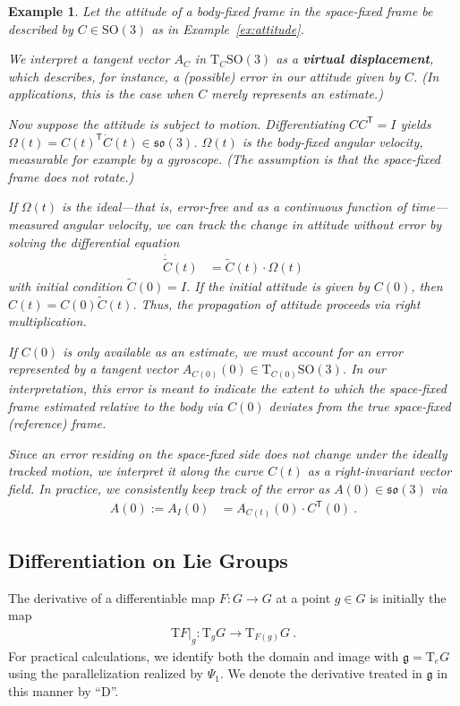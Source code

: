 \documentclass[10pt,a4paper]{article}
\theoremstyle{mytheorem}
\theoremstyle{mydefinition}
\newtheorem{example}[theorem]{Example}
\newcommand{\mydef}[1]{\textbf{\textit{#1}}}
\newcommand{\trans}{^\mathsf{T}}
\newcommand{\Dt}{\mathrm{D}}
\newcommand{\Tt}{\mathrm{T}}
\newcommand{\SO}{\mathrm{SO}}
\newcommand{\fso}{\mathfrak{so}}
\begin{document}
\begin{example}
\label{ex:attitude_error}
Let the attitude of a body-fixed frame in the space-fixed frame be described by $C\in\SO(3)$ as in Example~\ref{ex:attitude}.

We interpret a tangent vector $A_C$ in $\Tt_C\SO(3)$ as a \mydef{virtual displacement}, which describes, for instance, a (possible) error in our attitude given by $C$.
(In applications, this is the case when $C$ merely represents an \emph{estimate}.)

Now suppose the attitude is subject to motion.
Differentiating $CC\trans=I$ yields $\Omega(t)=C(t)\trans\dot{C}(t)\in\fso(3)$.
$\Omega(t)$ is the body-fixed angular velocity, measurable for example by a gyroscope. (The assumption is that the space-fixed frame does not rotate.)

If $\Omega(t)$ is the ideal---that is, error-free and as a continuous function of time---measured angular velocity,
we can track the change in attitude without error by solving the differential equation
\begin{align*}
	\dot{\tilde{C}}(t)
	&= \tilde{C}(t)\cdot\Omega(t)
\end{align*}
with initial condition $\tilde{C}(0)=I$.
If the initial attitude is given by $C(0)$,
then $C(t)=C(0)\tilde{C}(t)$.
Thus, the propagation of attitude proceeds via \emph{right multiplication}.

If $C(0)$ is only available as an estimate, we must account for an error represented by a tangent vector $A_{C(0)}(0)\in\Tt_{C(0)}\SO(3)$.
In our \emph{interpretation}, this error is meant to indicate the extent to which the \emph{space-fixed} frame estimated relative to the body via $C(0)$ deviates from the true space-fixed (reference) frame.

Since an error residing on the space-fixed side does not change under the ideally tracked motion, we interpret it along the curve $C(t)$ as a \emph{right-invariant} vector field.
In practice, we consistently keep track of the error as $A(0)\in\fso(3)$ via
\begin{align*}
	A(0) := A_I(0) &= A_{C(t)}(0)\cdot C\trans(0)
	\ .
\end{align*}
\end{example}

\subsection{Differentiation on Lie Groups}

The derivative of a differentiable map $F:G\rightarrow G$ at a point $g\in G$ is initially the map
\begin{align*}
	\Tt F|_g:
	\Tt_gG\rightarrow\Tt_{F(g)}G
	\ .
\end{align*}
For practical calculations, we identify both the domain and image with $\mathfrak{g}=\Tt_eG$ using the parallelization realized by $\Psi_1$.
We denote the derivative treated in $\mathfrak{g}$ in this manner by ``$\Dt$''.
\end{document}
